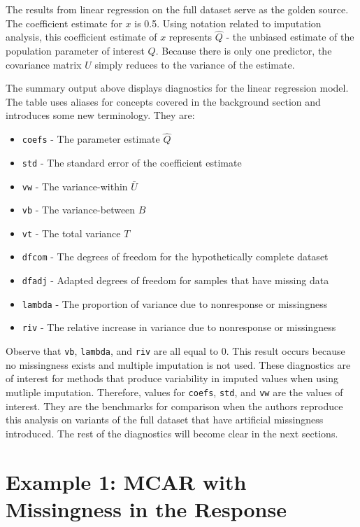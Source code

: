 \documentclass[12pt,oneside]{chicagocapstone}
\providecommand{\tightlist}{%
  \setlength{\itemsep}{0pt}\setlength{\parskip}{0pt}}
\begin{document}
The results from linear regression on the full dataset serve as the
golden source. The coefficient estimate for \(x\) is 0.5. Using notation
related to imputation analysis, this coefficient estimate of \(x\)
represents \(\hat Q\) - the unbiased estimate of the population
parameter of interest \(Q\). Because there is only one predictor, the
covariance matrix \(U\) simply reduces to the variance of the estimate.

The summary output above displays diagnostics for the linear regression
model. The table uses aliases for concepts covered in the background
section and introduces some new terminology. They are:
\begin{itemize}
\tightlist
\item
  \texttt{coefs} - The parameter estimate \(\hat Q\)
\item
  \texttt{std} - The standard error of the coefficient estimate
\item
  \texttt{vw} - The variance-within \(\bar U\)
\item
  \texttt{vb} - The variance-between \(B\)
\item
  \texttt{vt} - The total variance \(T\)
\item
  \texttt{dfcom} - The degrees of freedom for the hypothetically
  complete dataset
\item
  \texttt{dfadj} - Adapted degrees of freedom for samples that have
  missing data
\item
  \texttt{lambda} - The proportion of variance due to nonresponse or
  missingness
\item
  \texttt{riv} - The relative increase in variance due to nonresponse or
  missingness
\end{itemize}
Observe that \texttt{vb}, \texttt{lambda}, and \texttt{riv} are all
equal to 0. This result occurs because no missingness exists and
multiple imputation is not used. These diagnostics are of interest for
methods that produce variability in imputed values when using mutliple
imputation. Therefore, values for \texttt{coefs}, \texttt{std}, and
\texttt{vw} are the values of interest. They are the benchmarks for
comparison when the authors reproduce this analysis on variants of the
full dataset that have artificial missingness introduced. The rest of
the diagnostics will become clear in the next sections.

\section*{Example 1: MCAR with Missingness in the
Response}\label{example-1-mcar-with-missingness-in-the-response}
\end{document}
